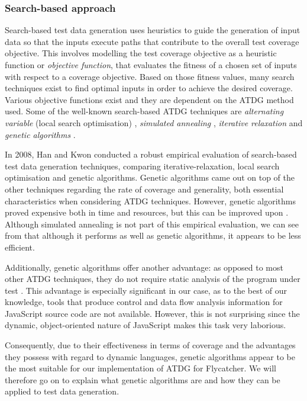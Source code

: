 \documentclass[a4paper,11pt,titlepage]{report}
\begin{document}
\subsubsection{Search-based approach}

Search-based test data generation uses heuristics to guide the generation of input data so that the inputs execute paths that contribute to the overall test coverage objective. This involves modelling the test coverage objective as a heuristic function or \emph{objective function}, that evaluates the fitness of a chosen set of inputs with respect to a coverage objective. Based on those fitness values, many search techniques exist to find optimal inputs in order to achieve the desired coverage. Various objective functions exist and they are dependent on the ATDG method used. Some of the well-known search-based ATDG techniques are \emph{alternating variable} (local search optimisation) \cite{korel1990automated, gallagher1997adtest}, \emph{simulated annealing} \cite{tracey1998automated,tracey1998way}, \emph{iterative relaxation} \cite{gupta1998automated} and \emph{genetic algorithms} \cite{michael1998automated,michael2001generating}.
	
In 2008, Han and Kwon \cite{han2008empirical} conducted a robust empirical evaluation of search-based test data generation techniques, comparing iterative-relaxation, local search optimisation and genetic algorithms. Genetic algorithms came out on top of the other techniques regarding the rate of coverage and generality, both essential characteristics when considering ATDG techniques. However, genetic algorithms proved expensive both in time and resources, but this can be improved upon \cite{han2008empirical}.
Although simulated annealing is not part of this empirical evaluation, we can see from \cite{michael1998automated} that although it performs as well as genetic algorithms, it appears to be less efficient.

Additionally, genetic algorithms offer another advantage: as opposed to most other ATDG techniques, they do not require static analysis of the program under test \cite{han2008empirical}. This advantage is especially significant in our case, as to the best of our knowledge, tools that produce control and data flow analysis information for JavaScript source code are not available. However, this is not surprising since the dynamic, object-oriented nature of JavaScript makes this task very laborious.

Consequently, due to their effectiveness in terms of coverage and the advantages they possess with regard to dynamic languages, genetic algorithms appear to be the most suitable for our implementation of ATDG for \textsf{Flycatcher}. We will therefore go on to explain what genetic algorithms are and how they can be applied to test data generation.
\end{document}
